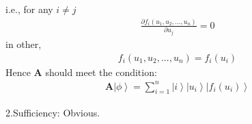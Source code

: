 \documentclass[%
 reprint,
 amsmath,amssymb,
pra,
]{revtex4-1}
\begin{document}
i.e., for any $i\neq j$
\begin{align*}
	\frac{\partial f_i\left(u_1, u_2, ..., u_n\right)}{\partial u_j} = 0
\end{align*}
in other, 
\begin{align*}
	f_i\left(u_1, u_2, ...,u_n\right) = f_i\left(u_i\right)
\end{align*}
Hence $\bm{A}$ should meet the condition: 
\begin{align*}
	\bm{A}\left|\phi\right\rangle = \sum_{i=1}^n \left|i\right\rangle\left|u_i\right\rangle\left|f_{i}\left(u_i\right)\right\rangle
\end{align*}

2.Sufficiency: Obvious.


\end{document}

